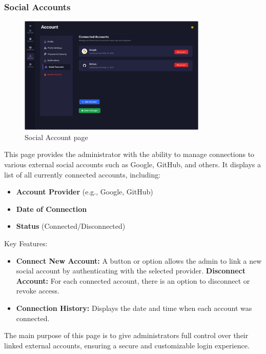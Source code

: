 \documentclass[11pt,a4paper]{article}
\begin{document}
\subsubsection{Social Accounts}
\begin{figure}[h]
    \centering
    \includegraphics[width=0.8\textwidth]{pictures/admin/Connected_Accounts_Admin}
     \caption{Social Account page}\label{fig:figure8}
\end{figure}
This page provides the administrator with the ability to manage connections to various external social accounts such as Google, GitHub, and others. It displays a list of all currently connected accounts, including:
\begin{itemize}
\item \textbf{Account Provider} (e.g., Google, GitHub)
\item \textbf{Date of Connection}
\item \textbf{Status} (Connected/Disconnected)
\end{itemize}
Key Features:
\begin{itemize}
\item \textbf{Connect New Account:} A button or option allows the admin to link a new social account by authenticating with the selected provider.
\textbf{Disconnect Account:} For each connected account, there is an option to disconnect or revoke access.
\item \textbf{Connection History:} Displays the date and time when each account was connected.
\end{itemize}
The main purpose of this page is to give administrators full control over their linked external accounts, ensuring a secure and customizable login experience.
\end{document}
